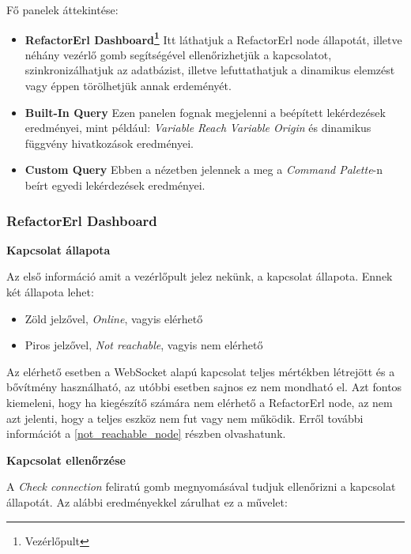 Fő panelek áttekintése:

\begin{itemize}
    \item \textbf{RefactorErl Dashboard\footnote{Vezérlőpult}} Itt láthatjuk a RefactorErl node állapotát, illetve néhány vezérlő gomb segítségével ellenőrizhetjük a kapcsolatot, szinkronizálhatjuk az adatbázist, illetve lefuttathatjuk  a dinamikus elemzést vagy éppen törölhetjük annak erdeményét.
    \item \textbf{Built-In Query} Ezen panelen fognak megjelenni a beépített lekérdezések eredményei, mint például: \textit{Variable Reach} \textit{Variable Origin} és dinamikus függvény hivatkozások eredményei.
    \item \textbf{Custom Query} Ebben a nézetben jelennek a meg a \textit{Command Palette}-n beírt egyedi lekérdezések eredményei.
\end{itemize}

\newpage

\subsubsection{RefactorErl Dashboard} \label{referlDashboard}

\noindent \textbf{Kapcsolat állapota}

Az első információ amit a vezérlőpult jelez nekünk, a kapcsolat állapota. Ennek két állapota lehet:

\begin{itemize}
    \item Zöld jelzővel, \textit{Online}, vagyis elérhető
    \item Piros jelzővel, \textit{Not reachable}, vagyis nem elérhető
\end{itemize}

Az elérhető esetben a WebSocket alapú kapcsolat teljes mértékben létrejött és a bővítmény használható, az utóbbi esetben sajnos ez nem mondható el. Azt fontos kiemeleni, hogy ha kiegészítő számára nem elérhető a RefactorErl node, az nem azt jelenti, hogy a teljes eszköz nem fut vagy nem működik. Erről további információt a \ref{not_reachable_node} részben olvashatunk.

\vspace{5mm}
\noindent \textbf{Kapcsolat ellenőrzése}

A \textit{Check connection} feliratú gomb megnyomásával tudjuk ellenőrizni a kapcsolat állapotát. Az alábbi eredményekkel zárulhat ez a művelet:

